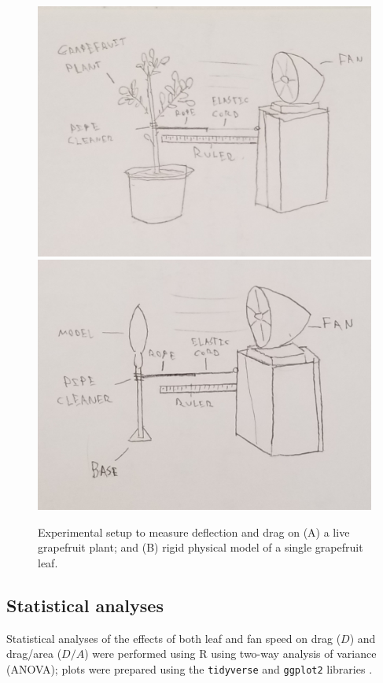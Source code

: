 \begin{figure}
\begin{center}
\includegraphics[width=0.49\columnwidth]{figures/Setup1.jpg} 
\includegraphics[width=0.49\columnwidth]{figures/Setup2.jpg}
\end{center}
\caption{Experimental setup to measure deflection and drag on (A) a live \Cxparadisi grapefruit plant; and (B) rigid physical model of a single grapefruit leaf.}
\label{fig:methods:drag}
\end{figure}













\subsection{Statistical analyses}
Statistical analyses of the effects of both leaf and fan speed on drag ($D$) and drag/area ($D/A$) were performed using R \citep{r2020} using two-way analysis of variance (ANOVA); plots were prepared using the \lstinline{tidyverse} and \lstinline{ggplot2} libraries \citep{wickham2019tidyverse}.

















